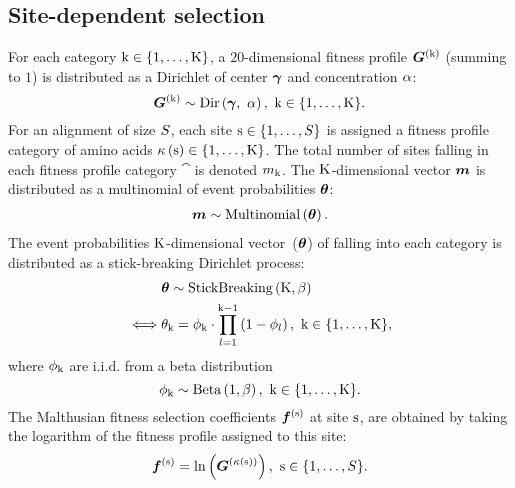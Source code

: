\subsection{Site-dependent selection}
\label{sec:profiles}
For each category $\text{k} \in \{1, \hdots, \text{K}\}$, a $20$-dimensional fitness profile $\bm{G}^{(\text{k})}$ (summing to $1$) is distributed as a Dirichlet of center $\bm{\gamma}$ and concentration $\alpha$:
\begin{equation}
    \label{eq:DistribBase}
    \Profile\catexp \sim \text{Dir}\left( \centerProfile,\ \concentrationProfile \right),\ \Setcat.
\end{equation}
For an alignment of size $S$, each site $\text{s} \in \{1, \hdots, S\}$ is assigned a fitness profile category of amino acids $\kappa\left(\text{s}\right) \in \{1, \hdots, \text{K}\} $.
The total number of sites falling in each fitness profile category $\cat$ is denoted $m_{\text{k}}$.
The $\text{K}$-dimensional vector $\bm{m}$ is distributed as a multinomial of event probabilities $\bm{\theta}$:
\begin{align}
    \label{eq:DistribMultinomial}
    \catMultiVar \sim \text{Multinomial}\left( \StickBreaking \right).
\end{align}
The event probabilities $\text{K}$-dimensional vector~($\bm{\theta}$) of falling into each category is distributed as a stick-breaking \gls{Dirichlet process}:
\begin{align}
    \label{eq:DistribStickBreaking}
    \begin{split}
        & \StickBreaking \sim \text{StickBreaking}\left( \Ncat, \stickbreakinghyper \right)\\
        \iff & \stickbreaking_{\cat} = \stick_{\cat}\cdot \prod _{{\indice=1}}^{{\cat-1}}\left(1-\stick_{\indice}\right),\ \Setcat,
    \end{split}
\end{align}
where $\phi_{\text{k}}$ are i.i.d.
from a beta distribution
\begin{equation}
    \label{eq:Beta}
    \stick_{\cat} \sim \text{Beta}\left( 1, \stickbreakinghyper \right),\ \Setcat.
\end{equation}
The Malthusian fitness selection coefficients $\bm{f}^{(\text{s})}$ at site $\text{s}$, are obtained by taking the logarithm of the fitness profile assigned to this site:
\begin{equation}
    \label{eq:sitefitness}
    \Fit\siteexp = \ln \left( \Profile^{\left( \catsite \right)} \right),\ \Setsite.
\end{equation}

